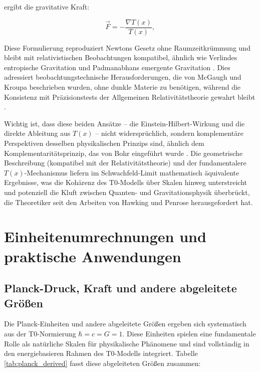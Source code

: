 \documentclass[twocolumn,aps,prl]{revtex4-2}
\begin{document}
		ergibt die gravitative Kraft:
		
		\begin{equation}
			\vec{F} = -\frac{\nabla T(x)}{T(x)}, \label{eq:grav_force}
		\end{equation}
		
		Diese Formulierung reproduziert Newtons Gesetz ohne Raumzeitkrümmung und bleibt mit relativistischen Beobachtungen kompatibel, ähnlich wie Verlindes entropische Gravitation \cite{Verlinde2011} und Padmanabhans emergente Gravitation \cite{Padmanabhan2012}. Dies adressiert beobachtungstechnische Herausforderungen, die von McGaugh \cite{McGaugh2011} und Kroupa \cite{Kroupa2012} beschrieben wurden, ohne dunkle Materie zu benötigen, während die Konsistenz mit Präzisionstests der Allgemeinen Relativitätstheorie gewahrt bleibt \cite{Will2014}.
		
		Wichtig ist, dass diese beiden Ansätze – die Einstein-Hilbert-Wirkung und die direkte Ableitung aus $T(x)$ – nicht widersprüchlich, sondern komplementäre Perspektiven desselben physikalischen Prinzips sind, ähnlich dem Komplementaritätsprinzip, das von Bohr eingeführt wurde \cite{Bohr1928}. Die geometrische Beschreibung (kompatibel mit der Relativitätstheorie) und der fundamentalere $T(x)$-Mechanismus liefern im Schwachfeld-Limit mathematisch äquivalente Ergebnisse, was die Kohärenz des T0-Modells über Skalen hinweg unterstreicht und potenziell die Kluft zwischen Quanten- und Gravitationsphysik überbrückt, die Theoretiker seit den Arbeiten von Hawking \cite{Hawking1975} und Penrose \cite{Penrose1965} herausgefordert hat.
		
		\section{Einheitenumrechnungen und praktische Anwendungen}
		\label{sec:conversions}
		
		\subsection{Planck-Druck, Kraft und andere abgeleitete Größen}
		\label{subsec:planck_derived}
		
		Die Planck-Einheiten und andere abgeleitete Größen ergeben sich systematisch aus der T0-Normierung $\hbar = c = G = 1$. Diese Einheiten spielen eine fundamentale Rolle als natürliche Skalen für physikalische Phänomene und sind vollständig in den energiebasieren Rahmen des T0-Modells integriert. Tabelle \ref{tab:planck_derived} fasst diese abgeleiteten Größen zusammen:
		
\end{document}
